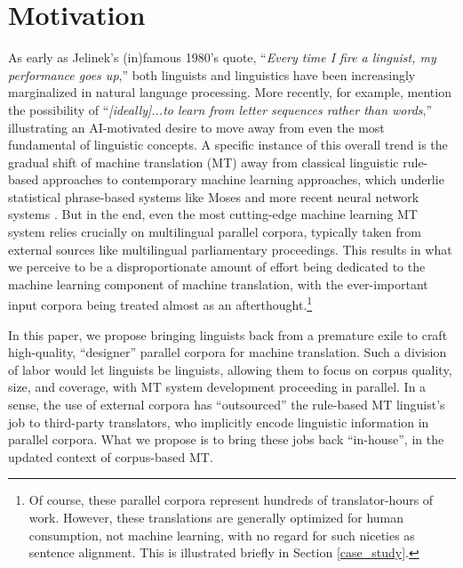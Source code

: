 \section{Motivation} 

As early as Jelinek's (in)famous 1980's quote, ``{\em Every time I fire a linguist, my performance goes up},'' both linguists and linguistics have been increasingly marginalized in natural language processing. 
More recently, for example,  mention the possibility of ``{\em [ideally]...to learn from letter sequences rather than words},'' illustrating an AI-motivated desire to move away from even the most fundamental of linguistic concepts.
A specific instance of this overall trend is the gradual shift of machine translation (MT) away from classical linguistic rule-based approaches  to contemporary machine learning approaches, which underlie statistical phrase-based systems like Moses  and more recent neural network systems .  
But in the end, even the most cutting-edge machine learning MT system relies crucially on multilingual parallel corpora, typically taken from external sources like multilingual parliamentary proceedings. 
This results in what we perceive to be a disproportionate amount of effort being dedicated to the machine learning component of machine translation, with the ever-important input corpora being treated almost as an afterthought.\footnote{
    Of course, these parallel corpora represent hundreds of translator-hours of work. 
    However, these translations are generally optimized for human consumption, not machine learning, with no regard for such niceties as sentence alignment.
    This is illustrated briefly in Section \ref{case_study}.
    }

In this paper, we propose bringing linguists back from a premature exile to craft high-quality, ``designer'' parallel corpora for machine translation.
Such a division of labor would let linguists be linguists, allowing them to focus on corpus quality, size, and coverage, with MT system development proceeding in parallel.  
In a sense, the use of external corpora has ``outsourced'' the rule-based MT linguist's job to third-party translators, who implicitly encode linguistic information in parallel corpora.  
What we propose is to bring these jobs back ``in-house'', in the updated context of corpus-based MT.



